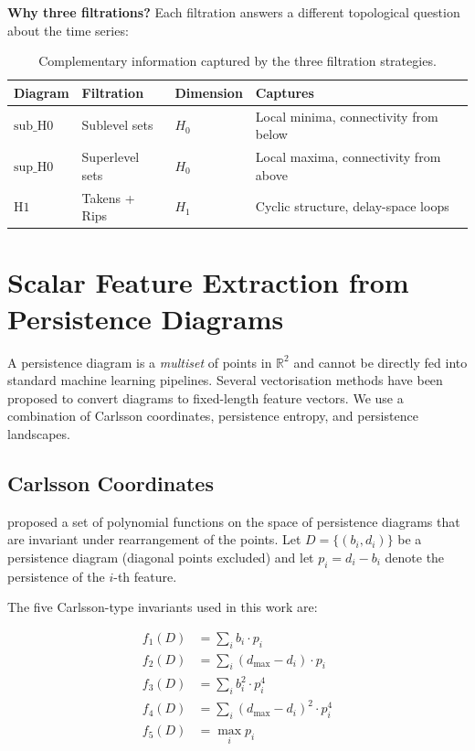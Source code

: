 \documentclass[12pt, a4paper]{article}
\theoremstyle{definition}
\theoremstyle{plain}
\newcommand{\R}{\mathbb{R}}
\begin{document}
\bigskip
\noindent
\textbf{Why three filtrations?} Each filtration answers a different topological
question about the time series:

\begin{table}[H]
\centering
\caption{Complementary information captured by the three filtration strategies.}
\label{tab:filtrations}
\begin{tabular}{llll}
\toprule
\textbf{Diagram} & \textbf{Filtration} & \textbf{Dimension} & \textbf{Captures} \\
\midrule
$\text{sub\_H0}$ & Sublevel sets      & $H_0$ & Local minima, connectivity from below \\
$\text{sup\_H0}$ & Superlevel sets    & $H_0$ & Local maxima, connectivity from above \\
$\text{H1}$      & Takens + Rips      & $H_1$ & Cyclic structure, delay-space loops \\
\bottomrule
\end{tabular}
\end{table}

\section{Scalar Feature Extraction from Persistence Diagrams}
\label{sec:feature_extraction}

A persistence diagram is a \emph{multiset} of points in $\R^2$ and cannot be
directly fed into standard machine learning pipelines. Several vectorisation
methods have been proposed to convert diagrams to fixed-length feature vectors.
We use a combination of Carlsson coordinates, persistence entropy, and persistence
landscapes.

\subsection{Carlsson Coordinates}

\citet{adcock2016ring} proposed a set of polynomial functions on the space of
persistence diagrams that are invariant under rearrangement of the points.
Let $D = \{(b_i, d_i)\}$ be a persistence diagram (diagonal points excluded)
and let $p_i = d_i - b_i$ denote the persistence of the $i$-th feature.

The five Carlsson-type invariants used in this work are:

\begin{align}
  f_1(D) &= \sum_i b_i \cdot p_i                        \label{eq:carl_f1} \\[4pt]
  f_2(D) &= \sum_i (d_{\max} - d_i) \cdot p_i           \label{eq:carl_f2} \\[4pt]
  f_3(D) &= \sum_i b_i^2 \cdot p_i^4                    \label{eq:carl_f3} \\[4pt]
  f_4(D) &= \sum_i (d_{\max} - d_i)^2 \cdot p_i^4       \label{eq:carl_f4} \\[4pt]
  f_5(D) &= \max_i p_i                                  \label{eq:carl_f5_max}
\end{align}
\end{document}
